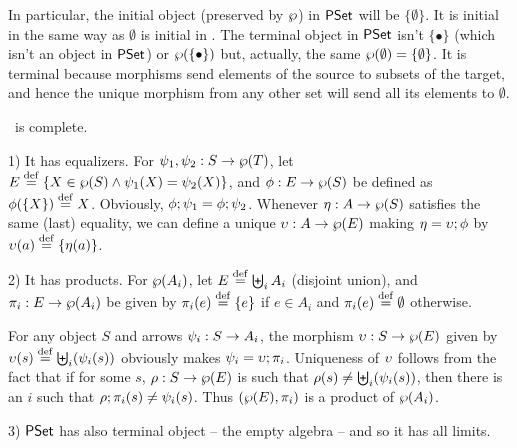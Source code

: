 \documentclass[10pt]{article}
\begin{document}
\noindent
In particular, the initial object (preserved by $\wp$) in $\mbox{\rm\sf PSet}$
will be $\{\emptyset\}$.  It is initial in the same way as $\emptyset$
is initial in \Set.  The terminal object in $\mbox{\rm\sf PSet}$ isn't $\{\bullet\}$
(which isn't an object in $\mbox{\rm\sf PSet}$) or $\wp(\{\bullet\})$ but,
actually, the same $\wp(\emptyset)=\{\emptyset\}$. It is terminal because
morphisms send elements of the source to subsets of the target, and
hence the unique morphism from any other set will send all its
elements to $\emptyset$.

\begin{Prop}
\label{le:PStcompl}
\PSt\ is complete.
\end{Prop}

\begin{Proof}
1) It has equalizers. For $\psi_1,\psi_2:S\rightarrow\wp(T)$, let $E\stackrel{{\rm \tiny{def}}}=
\{X\in\wp(S)\land\psi_1(X)=\psi_2(X)\}$, and $\phi:E\rightarrow\wp(S)$
be defined as $\phi(\{X\})\stackrel{{\rm \tiny{def}}}= X$. Obviously,
$\phi;\psi_1=\phi;\psi_2$. Whenever $\eta:A\rightarrow\wp(S)$
satisfies the same (last) equality, we can define a unique
$\upsilon:A\rightarrow\wp(E)$ making $\eta=\upsilon;\phi$ by
$\upsilon(a)\stackrel{{\rm \tiny{def}}}=\{\eta(a)\}$.

2) It has products. For $\wp(A_i)$, let $E\stackrel{{\rm \tiny{def}}}= \biguplus_i A_i$
(disjoint union), and $\pi_i:E\rightarrow\wp(A_i)$ be given by
$\pi_i(e)\stackrel{{\rm \tiny{def}}}=\{e\}$ if $e\in A_i$ and $\pi_i(e)\stackrel{{\rm \tiny{def}}}=\emptyset$
otherwise.

For any object $S$ and arrows $\psi_i:S\rightarrow A_i$, the morphism
$\upsilon:S\rightarrow\wp(E)$ given by $\upsilon(s) \stackrel{{\rm \tiny{def}}}= \biguplus_i(\psi_i(s))$
obviously makes $\psi_i=\upsilon;\pi_i$. Uniqueness of $\upsilon$
follows from the fact that if for some $s$, $\rho:S\rightarrow\wp(E)$ is
such that $\rho(s)\not=\biguplus_i(\psi_i(s))$, then there is an $i$
such that $\rho;\pi_i(s)\not =\psi_i(s)$. Thus
$(\wp(E),\pi_i)$ is a product of $\wp(A_i)$.

3) $\mbox{\rm\sf PSet}$ has also terminal object -- the empty algebra -- and so it
has all limits.
\end{Proof}

\end{document}

